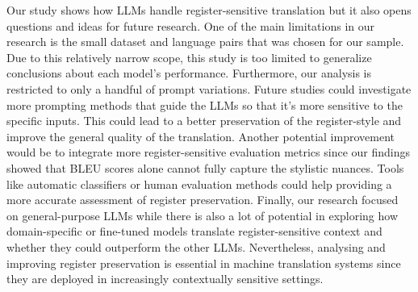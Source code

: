 \documentclass[fleqn,moreauthors,10pt]{ds_report}
\begin{document}
Our study shows how LLMs handle register-sensitive translation but it also opens questions and ideas for future research. One of the main limitations in our research is the small dataset and language pairs that was chosen for our sample. Due to this relatively narrow scope, this study is too limited to generalize conclusions about each model's performance. Furthermore, our analysis is restricted to only a handful of prompt variations. Future studies could investigate more prompting methods that guide the LLMs so that it's more sensitive to the specific inputs. This could lead to a better preservation of the register-style and improve the general quality of the translation. Another potential improvement would be to integrate more register-sensitive evaluation metrics since our findings showed that BLEU scores alone cannot fully capture the stylistic nuances. Tools like automatic classifiers or human evaluation methods could help providing a more accurate assessment of register preservation. 
Finally, our research focused on general-purpose LLMs while there is also a lot of potential in exploring how domain-specific or fine-tuned models translate register-sensitive context and whether they could outperform the other LLMs. Nevertheless, analysing and improving register preservation is essential in machine translation systems since they are deployed in increasingly contextually sensitive settings.
		
		

		
		
		
		
\end{document}
